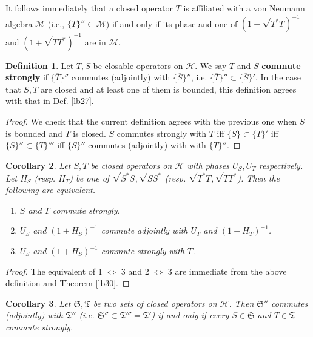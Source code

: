 \documentclass[12pt,b5paper,notitlepage]{article}
\theoremstyle{definition}
\newtheorem{df}{Definition}[section]
\theoremstyle{plain}
\newtheorem{co}[df]{Corollary}
\newcommand{\fk}{\mathfrak}
\newcommand{\mc}{\mathcal}
\newcommand{\ovl}{\overline}
\numberwithin{equation}{section}
\begin{document}
It follows immediately that a closed operator $T$ is affiliated with a von Neumann algebra $\mc M$ (i.e., $\{T\}''\subset\mc M$) if and only if its phase and one of $(1+\sqrt{T^*T})^{-1}$ and $(1+\sqrt{TT^*})^{-1}$ are in $\mc M$. 


 


\begin{df}
Let $T,S$ be closable operators on $\mc H$. We say $T$ and $S$ \textbf{commute strongly} if $\{\ovl T\}''$ commutes (adjointly) with $\{\ovl S\}''$, i.e. $\{\ovl T\}''\subset\{\ovl S\}'$. In the case that $S,T$ are closed and at least one of them is bounded, this definition agrees with that in Def. \ref{lb27}.
\end{df}

\begin{proof}
We check that the current definition agrees with the previous one when $S$ is bounded and $T$ is closed. $S$ commutes strongly with $T$ iff $\{S\}\subset\{T\}'$ iff $\{S\}''\subset\{T\}'''$ iff $\{S\}''$ commutes (adjointly) with with $\{T\}''$.
\end{proof}


\begin{co}\label{lb34}
Let $S,T$ be closed operators on $\mc H$ with phases $U_S,U_T$ respectively. Let $H_S$ (resp. $H_T$) be one of $\sqrt{S^*S},\sqrt{SS^*}$ (resp. $\sqrt{T^*T},\sqrt{TT^*}$). Then the following are equivalent.
\begin{enumerate}
\item $S$ and $T$ commute strongly.
\item $U_S$ and $(1+H_S)^{-1}$ commute adjointly with $U_T$ and $(1+H_T)^{-1}$.
\item $U_S$ and $(1+H_S)^{-1}$ commute strongly with $T$.
\end{enumerate}
\end{co}

\begin{proof}
The equivalent of 1 $\Leftrightarrow$ 3 and 2 $\Leftrightarrow$ 3 are immediate from the above definition and Theorem \ref{lb30}.
\end{proof}


\begin{co}\label{lb61}
Let $\fk S,\fk T$ be two sets of closed operators on $\mc H$. Then $\fk S''$ commutes (adjointly) with $\fk T''$ (i.e. $\fk S''\subset\fk T'''=\fk T'$) if and only if every $S\in\fk S$ and $T\in\fk T$ commute strongly.
\end{co}
\end{document}
